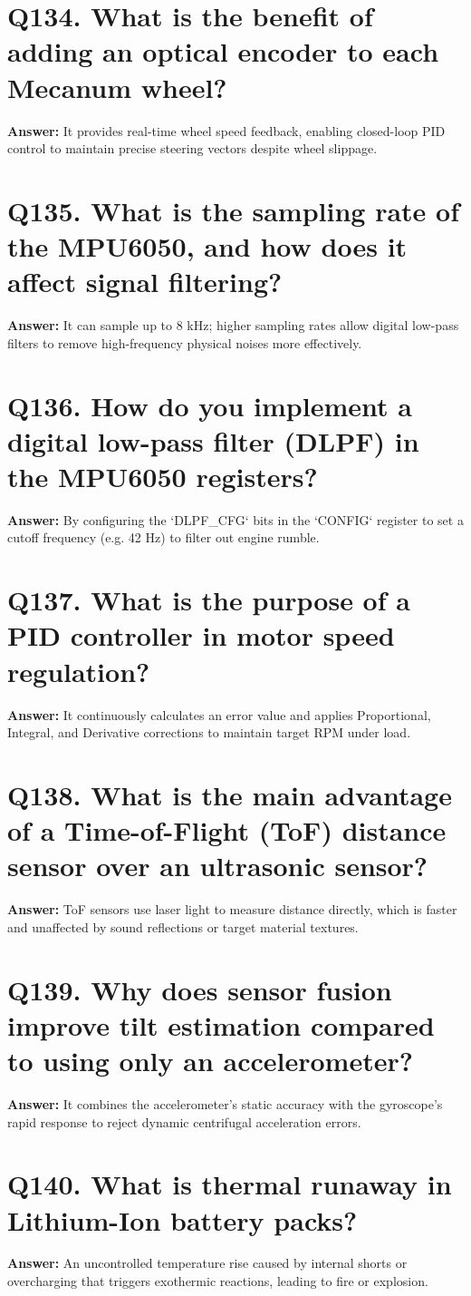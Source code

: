 \documentclass[12pt,a4paper,oneside]{report}
\begin{document}
\section{Q134. What is the benefit of adding an optical encoder to each Mecanum wheel?}
\textbf{Answer:} It provides real-time wheel speed feedback, enabling closed-loop PID control to maintain precise steering vectors despite wheel slippage.

\section{Q135. What is the sampling rate of the MPU6050, and how does it affect signal filtering?}
\textbf{Answer:} It can sample up to 8 kHz; higher sampling rates allow digital low-pass filters to remove high-frequency physical noises more effectively.

\section{Q136. How do you implement a digital low-pass filter (DLPF) in the MPU6050 registers?}
\textbf{Answer:} By configuring the `DLPF\_CFG` bits in the `CONFIG` register to set a cutoff frequency (e.g. 42 Hz) to filter out engine rumble.

\section{Q137. What is the purpose of a PID controller in motor speed regulation?}
\textbf{Answer:} It continuously calculates an error value and applies Proportional, Integral, and Derivative corrections to maintain target RPM under load.

\section{Q138. What is the main advantage of a Time-of-Flight (ToF) distance sensor over an ultrasonic sensor?}
\textbf{Answer:} ToF sensors use laser light to measure distance directly, which is faster and unaffected by sound reflections or target material textures.

\section{Q139. Why does sensor fusion improve tilt estimation compared to using only an accelerometer?}
\textbf{Answer:} It combines the accelerometer's static accuracy with the gyroscope's rapid response to reject dynamic centrifugal acceleration errors.

\section{Q140. What is thermal runaway in Lithium-Ion battery packs?}
\textbf{Answer:} An uncontrolled temperature rise caused by internal shorts or overcharging that triggers exothermic reactions, leading to fire or explosion.
\end{document}
